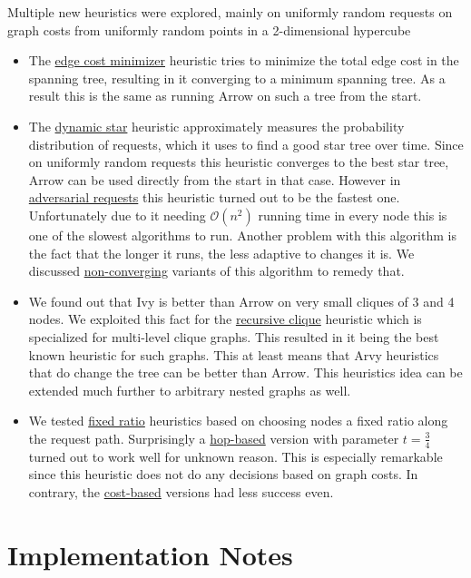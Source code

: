 \documentclass[a4paper, oneside]{discothesis}
\begin{document}
Multiple new heuristics were explored, mainly on uniformly random requests on graph costs from uniformly random points in a 2-dimensional hypercube
\begin{itemize}
\item The \hyperref[alg:ecm]{edge cost minimizer} heuristic tries to minimize the total edge cost in the spanning tree, resulting in it converging to a minimum spanning tree. As a result this is the same as running Arrow on such a tree from the start.
\item The \hyperref[alg:dynstar]{dynamic star} heuristic approximately measures the probability distribution of requests, which it uses to find a good star tree over time. Since on uniformly random requests this heuristic converges to the best star tree, Arrow can be used directly from the start in that case. However in \hyperref[req:adversary]{adversarial requests} this heuristic turned out to be the fastest one. Unfortunately due to it needing $\mathcal{O}(n^2)$ running time in every node this is one of the slowest algorithms to run. Another problem with this algorithm is the fact that the longer it runs, the less adaptive to changes it is. We discussed \hyperref[alg:ncdynstar]{non-converging} variants of this algorithm to remedy that.
\item We found out that Ivy is better than Arrow on very small cliques of 3 and 4 nodes. We exploited this fact for the \hyperref[alg:reclique]{recursive clique} heuristic which is specialized for multi-level clique graphs. This resulted in it being the best known heuristic for such graphs. This at least means that Arvy heuristics that do change the tree can be better than Arrow. This heuristics idea can be extended much further to arbitrary nested graphs as well.
\item We tested \hyperref[alg:fr]{fixed ratio} heuristics based on choosing nodes a fixed ratio along the request path. Surprisingly a \hyperref[alg:frh]{hop-based} version with parameter $t=\frac{3}{4}$ turned out to work well for unknown reason. This is especially remarkable since this heuristic does not do any decisions based on graph costs. In contrary, the \hyperref[alg:frc]{cost-based} versions had less success even.
\end{itemize}




\appendix

\chapter{Implementation Notes}
\end{document}

